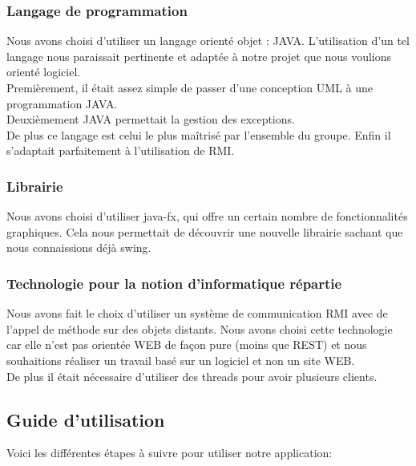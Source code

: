 \documentclass[11pt,dvipsnames,svgnames]{report}
\begin{document}
\subsubsection{Langage de programmation}
Nous avons choisi d'utiliser un langage orienté objet : JAVA. L'utilisation d'un tel langage nous paraissait pertinente et adaptée à notre projet que nous voulions orienté logiciel.\\
Premièrement, il était assez simple de passer d'une conception UML à une programmation JAVA. \\
Deuxièmement JAVA permettait la gestion des exceptions.\\
De plus ce langage est celui le plus maîtrisé par l'ensemble du groupe.
Enfin il s'adaptait parfaitement à l'utilisation de RMI.\\
\subsubsection{Librairie}
Nous avons choisi d'utiliser java-fx, qui offre un certain nombre de fonctionnalités graphiques. Cela nous permettait de découvrir une nouvelle librairie sachant que nous connaissions déjà swing.
\subsubsection{Technologie pour la notion d'informatique répartie}
Nous avons fait le choix d'utiliser un système de communication RMI avec de l'appel de méthode sur des objets distants. Nous avons choisi cette technologie car elle n'est pas orientée WEB de façon pure (moins que REST) et nous souhaitions réaliser un travail basé sur un logiciel et non un site WEB.\\
De plus il était nécessaire d'utiliser des threads pour avoir plusieurs clients. 
\subsection{Guide d'utilisation}
Voici les différentes étapes à suivre pour utiliser notre application:
\end{document}
